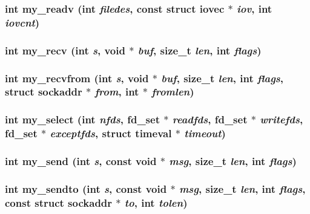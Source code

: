 \subsubsection{\setlength{\rightskip}{0pt plus 5cm}int my\_\-readv (int {\em filedes}, const struct iovec $\ast$ {\em iov}, int {\em iovcnt})}\label{mysock_8h_a12}


\subsubsection{\setlength{\rightskip}{0pt plus 5cm}int my\_\-recv (int {\em s}, void $\ast$ {\em buf}, size\_\-t {\em len}, int {\em flags})}\label{mysock_8h_a6}


\subsubsection{\setlength{\rightskip}{0pt plus 5cm}int my\_\-recvfrom (int {\em s}, void $\ast$ {\em buf}, size\_\-t {\em len}, int {\em flags}, struct sockaddr $\ast$ {\em from}, int $\ast$ {\em fromlen})}\label{mysock_8h_a9}


\subsubsection{\setlength{\rightskip}{0pt plus 5cm}int my\_\-select (int {\em nfds}, fd\_\-set $\ast$ {\em readfds}, fd\_\-set $\ast$ {\em writefds}, fd\_\-set $\ast$ {\em exceptfds}, struct timeval $\ast$ {\em timeout})}\label{mysock_8h_a11}


\subsubsection{\setlength{\rightskip}{0pt plus 5cm}int my\_\-send (int {\em s}, const void $\ast$ {\em msg}, size\_\-t {\em len}, int {\em flags})}\label{mysock_8h_a7}


\subsubsection{\setlength{\rightskip}{0pt plus 5cm}int my\_\-sendto (int {\em s}, const void $\ast$ {\em msg}, size\_\-t {\em len}, int {\em flags}, const struct sockaddr $\ast$ {\em to}, int {\em tolen})}\label{mysock_8h_a8}



